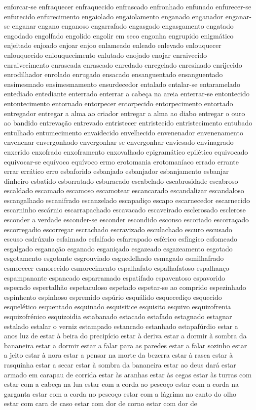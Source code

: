 \documentclass[ruledheader]{abnt_UFF}
\begin{document}
enforcar-se enfraquecer enfraquecido enfrascado enfronhado enfunado enfurecer-se enfurecido enfurecimento engaiolado engaiolamento enganado enganador enganar-se enganar engano enganoso engarrafado engasgado engasgamento engatado engodado engolfado engolido engolir em seco engonha engrupido enigm\'{a}tico enjeitado enjoado enjoar enjoo enlameado enleado enlevado enlouquecer enlouquecido enlouquecimento enlutado enojado enojar enraivecido enraivecimento enrascada enrascado enredado enregelado enresinado enrijecido enrodilhador enrolado enrugado ensacado ensanguentado ensanguentado ensimesmado ensimesmamento ensurdecedor entalado entalar-se entaramelado entediado entediante enterrado enterrar a cabe\c{c}a na areia enterrar-se entontecido entontecimento entornado entorpecer entorpecido entorpecimento entortado entregador entregar a alma ao criador entregar a alma ao diabo entregar o ouro ao bandido entreva\c{c}\~ao entrevado entristecer entristecido entristecimento entubado entulhado entumecimento envaidecido envelhecido envenenador envenenamento envenenar envergonhado envergonhar-se envergonhar enviesado envinagrado enxerido enxofrado enxoframento enxovalhado epigram\'{a}tico epil\'{e}tico equivocado equivocar-se equ\'{i}voco equ\'{i}voco ermo erotomania erotoman\'{i}aco errado errante errar err\'{a}tico erro esbaforido esbanjado esbanjador esbanjamento esbanjar dinheiro esbatido esborratado esburacado escabelado escabrosidade escabroso escaldado escamado escamoso escamotear escancarado escandalizar escandaloso escangalhado escanifrado escanzelado escapadi\c{c}o escapo escarnecedor escarnecido escarninho esc\'{a}rnio escarrapachado escavacado escaveirado esclerosado esclerose esconder a verdade esconder-se esconder escondido esconso escoriado escorra\c{c}ado escorregadio escorregar escrachado escravizado esculachado escuro escusado escuso esdr\'{u}xulo esfaimado esfalfado esfarrapado esf\'{e}rico esf\'{i}ngico esfomeado esgalgado esgana\c{c}\~ao esganado esgani\c{c}ado esgazeado esgazeamento esgotado esgotamento esgotante esgrouviado esguedelhado esmagado esmilhafrado esmorecer esmorecido esmorecimento espalhafato espalhafatoso espalhan\c{c}o espampanante espancado esparramado espatifado espaventoso espavorido especado espertalh\~ao espetaculoso espetado espetar-se ao comprido espezinhado espinhento espinhoso espremido esp\'{u}rio esqu\'{a}lido esquecedi\c{c}o esquecido esquel\'{e}tico esquentado esquinado esquisitice esquisito esquivo esquizofrenia esquizofr\'{e}nico esquizoidia estabanado estacado estafado estagnado estagnar estalado estalar o verniz estampado estancado estanhado estapaf\'{u}rdio estar a anos luz de estar \`{a} beira do precip\'{i}cio estar \`{a} deriva estar a dormir \`{a} sombra da bananeira estar a dormir estar a falar para as paredes estar a falar sozinho estar a jeito estar \`{a} nora estar a pensar na morte da bezerra estar \`{a} rasca estar \`{a} rasquinha estar a secar estar \`{a} sombra da bananeira estar ao deus dar\'{a} estar armado em carapau de corrida estar \`{a}s aranhas estar \`{a}s cegas estar \`{a}s turras com estar com a cabe\c{c}a na lua estar com a corda ao pesco\c{c}o estar com a corda na garganta estar com a corda no pesco\c{c}o estar com a l\'{a}grima no canto do olho estar com cara de caso estar com dor de corno estar com dor de 
\end{document}
